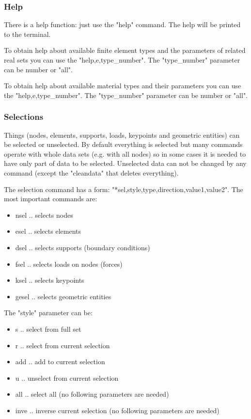 \documentclass{article}
\begin{document}
\subsubsection{Help}

 There is a help function: just use the "help" command.
 The help will be printed to the terminal.

 To obtain help about available finite element types
 and the parameters of related real sets you can 
 use the "help,e,type\_number". The "type\_number" parameter
 can be number or "all".

 To obtain help about available material types
 and their parameters you can 
 use the "help,e,type\_number". The "type\_number" parameter
 can be number or "all".



\subsubsection{Selections}

 Things (nodes, elements, supports, loads, keypoints
 and geometric entities) can be selected or unselected.
 By default everything is selected but many commands operate
 with whole data sets (e.g. with all nodes) so in some cases
 it is needed to have only part of data to be selected.
 Unselected data can not be changed by any command (except
 the "cleandata" that deletes everything).

 The selection command has a form: "*sel,style,type,direction,value1,value2".
 The most important commands are:


\begin{itemize}
\item  nsel .. selects nodes
\item  esel .. selects elements
\item  dsel .. selects supports (boundary conditions)
\item  fsel .. selects loads on nodes (forces)
\item  ksel .. selects keypoints
\item  gesel .. selects geometric entities
\end{itemize}

 The "style" parameter can be:


\begin{itemize}
\item  s .. select from full set
\item  r .. select from current selection
\item  add .. add to current selection
\item  u .. unselect from current selection
\item  all .. select all (no following parameters are needed)
\item  inve .. inverse current selection (no following parameters are needed)
\end{itemize}
\end{document}
